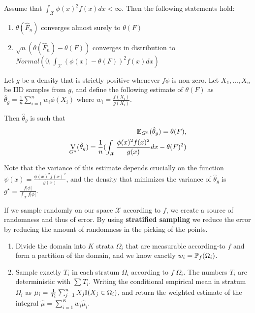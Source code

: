 \begin{thm}
  \label{sec:monte-carlo-method-3}
  Assume that $\int_{\mathcal{X}} \phi(x)^{2} f(x) dx < \infty$.  Then
  the following statements hold:
  \begin{enumerate}
  \item $\theta(\hat F_{n})$ converges almost surely to $\theta(F)$
  \item $\sqrt{n} (\theta(\hat F_{n}) - \theta(F))$ converges in
    distribution to $Normal(0, \int_{\mathcal{X}} (\phi(x) -
    \theta(F))^{2} f(x) dx)$
  \end{enumerate}
\end{thm}

\begin{thm}
  \label{sec:monte-carlo-method-4}
  Let $g$ be a density that is strictly positive whenever $f \phi$ is
  non-zero.  Let $X_{1}, \dots, X_{n}$ be IID samples from $g$, and
  define the following estimate of  $\theta(F)$ as $\hat \theta_{g} =
  \frac{1}{n} \sum_{i=1}^{n} w_{i} \phi(X_{i})$ where $w_{i} =
  \frac{f(X_{i})}{g(X_{i})}$.

  Then $\hat \theta_{g}$ is such that
  \begin{align}
    \label{eq:3}
    \E_{G^{n}}(\hat \theta_{g}) = \theta(F), \\
    \label{eq:4}
    \V_{G^{n}}(\hat \theta_{g}) = \frac{1}{n} (\int_{\mathcal{X}}
    \frac{\phi(x)^{2} f(x)^{2}}{g(x)} dx - \theta(F)^{2})
  \end{align}
\end{thm}

\begin{thm}
  \label{sec:monte-carlo-method-5}
  Note that the variance of this estimate depends crucially on the
  function $\psi(x) = \frac{\phi(x)^{2} f(x)^{2}}{g(x)}$, and the
  density that minimizes the variance of $\hat \theta_{g}$ is
  $g^{\star} = \frac{f |\phi|}{\int_{\mathcal{X}} f |\phi|}$.
\end{thm}

\begin{defn}
  \label{sec:monte-carlo-method-6}
  If we sample randomly on our space $\mathcal{X}$ according to $f$,
  we create a source of randomness and thus of error.  By using
  \textbf{stratified sampling} we reduce the error by reducing the
  amount of randomness in the picking of the points.

  \begin{enumerate}
  \item Divide the domain into $K$ strata $\Omega_{i}$ that are
    measurable according-to $f$ and form a partition of the domain, and
    we know exactly $w_{i} = \Prob_{f}(\Omega_{i})$.
  \item Sample exactly $T_{i}$ in each stratum $\Omega_{i}$ according
    to $f | \Omega_{i}$.  The numbers $T_{i}$ are deterministic with
    $\sum_{}^{} T_{i}$.  Writing the conditional empirical mean in
    stratum $\Omega_{i}$ as $\mu_{i} = \frac{1}{T_{i}} \sum_{j=1}^{n}
    X_{j} \I{X_{j} \in \Omega_{i}}$, and return the weighted estimate
    of the integral $\hat \mu = \sum_{i=1}^{K} w_{i} \hat \mu_{i}$.
  \end{enumerate}
\end{defn}

